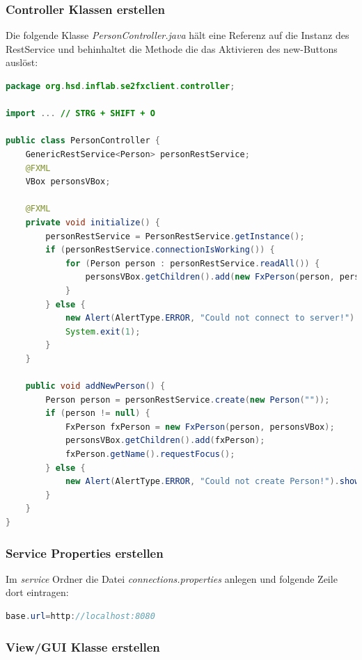 \documentclass[11pt]{scrartcl}
\begin{document}
\subsubsection{Controller Klassen erstellen}
\label{sec:controllerclasses}
Die folgende Klasse \textit{PersonController.java} hält eine Referenz auf
die Instanz des RestService und behinhaltet die Methode die das Aktivieren des
new-Buttons auslöst:
\begin{lstlisting}[language=java]
package org.hsd.inflab.se2fxclient.controller;

import ... // STRG + SHIFT + O

public class PersonController {
    GenericRestService<Person> personRestService;
    @FXML
    VBox personsVBox;

    @FXML
    private void initialize() {
        personRestService = PersonRestService.getInstance();
        if (personRestService.connectionIsWorking()) {
            for (Person person : personRestService.readAll()) {
                personsVBox.getChildren().add(new FxPerson(person, personsVBox));
            }
        } else {
            new Alert(AlertType.ERROR, "Could not connect to server!").showAndWait();
            System.exit(1);
        }
    }

    public void addNewPerson() {
        Person person = personRestService.create(new Person(""));
        if (person != null) {
            FxPerson fxPerson = new FxPerson(person, personsVBox);
            personsVBox.getChildren().add(fxPerson);
            fxPerson.getName().requestFocus();
        } else {
            new Alert(AlertType.ERROR, "Could not create Person!").showAndWait();
        }
    }
}
\end{lstlisting}

\newpage
\subsubsection{Service Properties erstellen}
\label{sec:serviceproperties}
Im \textit{service} Ordner die Datei \textit{connections.properties} anlegen
und folgende Zeile dort eintragen:
\begin{lstlisting}[language=java]
base.url=http://localhost:8080
\end{lstlisting}

\subsubsection{View/GUI Klasse erstellen}
\label{sec:createviewclass}
\end{document}
